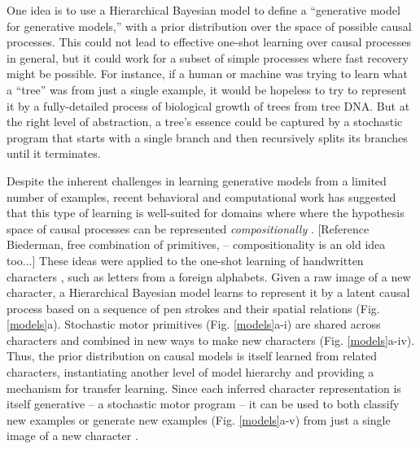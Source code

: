 \documentclass[10pt,letterpaper]{article}
\begin{document}
One idea is to use a Hierarchical Bayesian model \cite{Gelman2004} to define a ``generative model for generative models,'' with a prior distribution over the space of possible causal processes. This could not lead to effective one-shot learning over causal processes in general, but it could work for a subset of simple processes where fast recovery might be possible. For instance, if a human or machine was trying to learn what a ``tree'' was from just a single example, it would be hopeless to try to represent it by a fully-detailed process of biological growth of trees from tree DNA. But at the right level of abstraction, a tree's essence could be captured by a stochastic program that starts with a single branch and then recursively splits its branches until it terminates.

Despite the inherent challenges in learning generative models from a limited number of examples, recent behavioral and computational work has suggested that this type of learning is well-suited for domains where where the hypothesis space of causal processes can be represented \emph{compositionally} \cite{Lake2012,Lake2013}. [Reference Biederman, free combination of primitives, -- compositionality is an old idea too...] These ideas were applied to the one-shot learning of handwritten characters \cite{Lake2013}, such as letters from a foreign alphabets. Given a raw image of a new character, a Hierarchical Bayesian model learns to represent it by a latent causal process based on a sequence of pen strokes and their spatial relations (Fig. \ref{models}a). Stochastic motor primitives (Fig. \ref{models}a-i) are shared across characters and combined in new ways to make new characters (Fig. \ref{models}a-iv). Thus, the prior distribution on causal models is itself learned from related characters, instantiating another level of model hierarchy and providing a mechanism for transfer learning. Since each inferred character representation is itself generative -- a stochastic motor program -- it can be used to both classify new examples or generate new examples (Fig. \ref{models}a-v) from just a single image of a new character \cite{Lake2013}.
\end{document}
